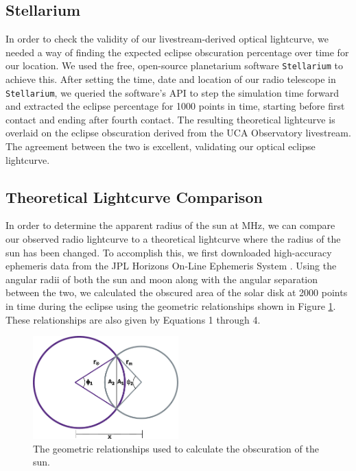 \subsection{\label{sec:stellarium}Stellarium}

In order to check the validity of our livestream-derived optical lightcurve, we needed a way of finding the expected eclipse obscuration percentage over time for our location.
We used the free, open-source planetarium software \texttt{Stellarium}\cite{zotti_simulated_2020} to achieve this.
After setting the time, date and location of our radio telescope in \texttt{Stellarium}\cite{zotti_simulated_2020}, we queried the software's API to step the simulation time forward and extracted the eclipse percentage for 1000 points in time, starting before first contact and ending after fourth contact.
The resulting theoretical lightcurve is overlaid on the eclipse obscuration derived from the UCA Observatory livestream.
The agreement between the two is excellent, validating our optical eclipse lightcurve.

\subsection{\label{sec:theoreticalLightcurves}Theoretical Lightcurve Comparison}

In order to determine the apparent radius of the sun at \unit[1420]{MHz}, we can compare our observed radio lightcurve to a theoretical lightcurve where the radius of the sun has been changed.
To accomplish this, we first downloaded high-accuracy ephemeris data from the JPL Horizons On-Line Ephemeris System \cite{nasa_jpl_solar_system_dynamics_group_jpl_nodate}. 
Using the angular radii of both the sun and moon along with the angular separation between the two, we calculated the obscured area of the solar disk at 2000 points in time during the eclipse using the geometric relationships shown in Figure \ref{fig:eclipse_geometry}.
These relationships are also given by Equations 1 through 4.

\begin{figure}
  \includegraphics[width=0.5\textwidth]{figures/drawing}
  \caption{\label{fig:eclipse_geometry} The geometric relationships used to calculate the obscuration of the sun.}
\end{figure}

